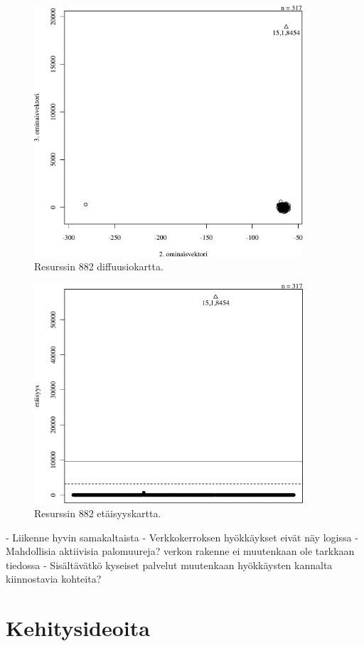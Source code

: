 \begin{figure}[p]
\centering
\includegraphics[width=10cm]{pics/diffuusiokuvat/service_882.pdf}
\caption{Resurssin 882 diffuusiokartta.}
\label{diffusio_882}
\end{figure}

\begin{figure}[p]
\centering
\includegraphics[width=10cm]{pics/tiheyskuvat/service_882.pdf}
\caption{Resurssin 882  etäisyyskartta.}
\label{service_882}
\end{figure}

- Liikenne hyvin samakaltaista
- Verkkokerroksen hyökkäykset eivät näy logissa
- Mahdollisia aktiivisia palomuureja? verkon rakenne ei muutenkaan ole tarkkaan tiedossa
- Sisältävätkö kyseiset palvelut muutenkaan hyökkäysten kannalta kiinnostavia kohteita?


\section{Kehitysideoita}

